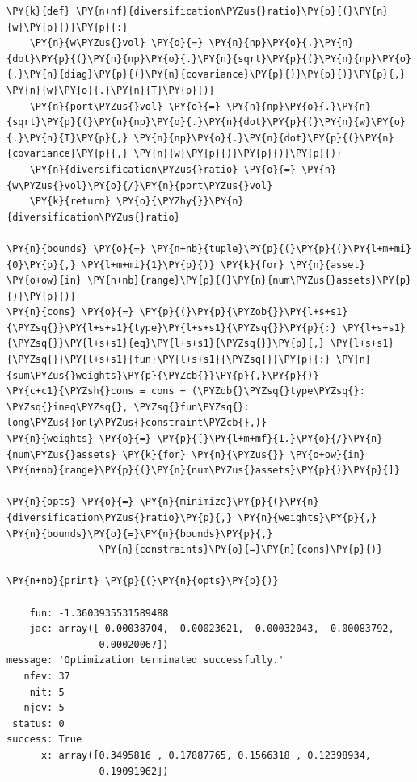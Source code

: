 \begin{tcolorbox}[breakable, size=fbox, boxrule=1pt, pad at break*=1mm,colback=cellbackground, colframe=cellborder]
\begin{Verbatim}[commandchars=\\\{\}]
\PY{k}{def} \PY{n+nf}{diversification\PYZus{}ratio}\PY{p}{(}\PY{n}{w}\PY{p}{)}\PY{p}{:}
    \PY{n}{w\PYZus{}vol} \PY{o}{=} \PY{n}{np}\PY{o}{.}\PY{n}{dot}\PY{p}{(}\PY{n}{np}\PY{o}{.}\PY{n}{sqrt}\PY{p}{(}\PY{n}{np}\PY{o}{.}\PY{n}{diag}\PY{p}{(}\PY{n}{covariance}\PY{p}{)}\PY{p}{)}\PY{p}{,} \PY{n}{w}\PY{o}{.}\PY{n}{T}\PY{p}{)}
    \PY{n}{port\PYZus{}vol} \PY{o}{=} \PY{n}{np}\PY{o}{.}\PY{n}{sqrt}\PY{p}{(}\PY{n}{np}\PY{o}{.}\PY{n}{dot}\PY{p}{(}\PY{n}{w}\PY{o}{.}\PY{n}{T}\PY{p}{,} \PY{n}{np}\PY{o}{.}\PY{n}{dot}\PY{p}{(}\PY{n}{covariance}\PY{p}{,} \PY{n}{w}\PY{p}{)}\PY{p}{)}\PY{p}{)}
    \PY{n}{diversification\PYZus{}ratio} \PY{o}{=} \PY{n}{w\PYZus{}vol}\PY{o}{/}\PY{n}{port\PYZus{}vol}
    \PY{k}{return} \PY{o}{\PYZhy{}}\PY{n}{diversification\PYZus{}ratio}
	
\PY{n}{bounds} \PY{o}{=} \PY{n+nb}{tuple}\PY{p}{(}\PY{p}{(}\PY{l+m+mi}{0}\PY{p}{,} \PY{l+m+mi}{1}\PY{p}{)} \PY{k}{for} \PY{n}{asset} \PY{o+ow}{in} \PY{n+nb}{range}\PY{p}{(}\PY{n}{num\PYZus{}assets}\PY{p}{)}\PY{p}{)}
\PY{n}{cons} \PY{o}{=} \PY{p}{(}\PY{p}{\PYZob{}}\PY{l+s+s1}{\PYZsq{}}\PY{l+s+s1}{type}\PY{l+s+s1}{\PYZsq{}}\PY{p}{:} \PY{l+s+s1}{\PYZsq{}}\PY{l+s+s1}{eq}\PY{l+s+s1}{\PYZsq{}}\PY{p}{,} \PY{l+s+s1}{\PYZsq{}}\PY{l+s+s1}{fun}\PY{l+s+s1}{\PYZsq{}}\PY{p}{:} \PY{n}{sum\PYZus{}weights}\PY{p}{\PYZcb{}}\PY{p}{,}\PY{p}{)}
\PY{c+c1}{\PYZsh{}cons = cons + (\PYZob{}\PYZsq{}type\PYZsq{}: \PYZsq{}ineq\PYZsq{}, \PYZsq{}fun\PYZsq{}:  long\PYZus{}only\PYZus{}constraint\PYZcb{},)}
\PY{n}{weights} \PY{o}{=} \PY{p}{[}\PY{l+m+mf}{1.}\PY{o}{/}\PY{n}{num\PYZus{}assets} \PY{k}{for} \PY{n}{\PYZus{}} \PY{o+ow}{in} \PY{n+nb}{range}\PY{p}{(}\PY{n}{num\PYZus{}assets}\PY{p}{)}\PY{p}{]}
	
\PY{n}{opts} \PY{o}{=} \PY{n}{minimize}\PY{p}{(}\PY{n}{diversification\PYZus{}ratio}\PY{p}{,} \PY{n}{weights}\PY{p}{,} \PY{n}{bounds}\PY{o}{=}\PY{n}{bounds}\PY{p}{,} 
                \PY{n}{constraints}\PY{o}{=}\PY{n}{cons}\PY{p}{)}
	
\PY{n+nb}{print} \PY{p}{(}\PY{n}{opts}\PY{p}{)}

    fun: -1.3603935531589488
    jac: array([-0.00038704,  0.00023621, -0.00032043,  0.00083792,  
                0.00020067])
message: 'Optimization terminated successfully.'
   nfev: 37
    nit: 5
   njev: 5
 status: 0
success: True
      x: array([0.3495816 , 0.17887765, 0.1566318 , 0.12398934, 
                0.19091962])


\end{Verbatim}
\end{tcolorbox}
